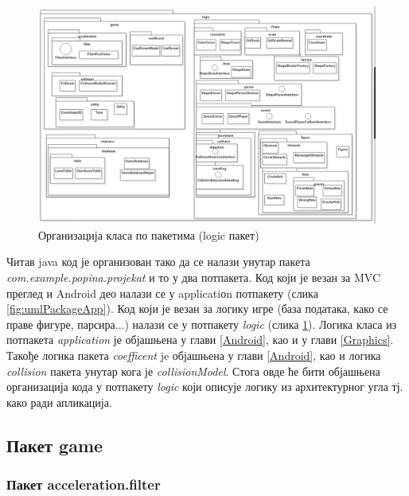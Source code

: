 \begin{figure}[htb!]
\begin{center}
\includegraphics[scale=.6]{pictures/UML/package/logic}
\caption{Организација класа по пакетима (logic пакет)}\label{fig:umlPackageLog}
\end{center}
\end{figure}

Читав java код је организован тако да се налази унутар пакета \emph{com.example.popina.projekat} и то у два потпакета. Код који је везан за MVC преглед и Android део налази се у applicatiоn потпакету (слика \ref{fig:umlPackageApp}). Код који је везан за логику игре (база података, како се праве фигуре, парсира...) налази се у потпакету \emph{logic} (слика \ref{fig:umlPackageLog}). Логика класа из потпакета \emph{application} је објашњена у глави \ref{Android}, као и у глави \ref{Graphics}. Такође логика пакета \emph{coefficent} je објашњена у глави  \ref{Android}, као и логика \emph{collision} пакета унутар кога је \emph{collisionModel}. Стога овде ће бити објашњена организација кода у потпакету \emph{logic }који описује логику из архитектурног угла тј. како ради апликација. 

\subsection{Пакет game}
\subsubsection{Пакет acceleration.filter}



